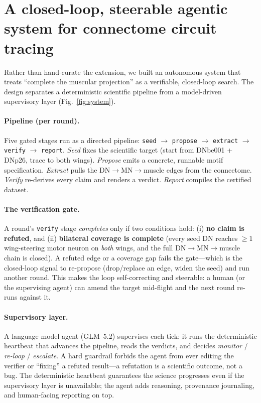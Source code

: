\documentclass[11pt]{article}
\newcommand{\ttt}[1]{\texttt{\small #1}}
\begin{document}
\section{A closed-loop, steerable agentic system for connectome circuit tracing}

Rather than hand-curate the extension, we built an autonomous system that treats ``complete the
muscular projection'' as a verifiable, closed-loop search. The design separates a deterministic
scientific pipeline from a model-driven supervisory layer (Fig.~\ref{fig:system}).

\paragraph{Pipeline (per round).} Five gated stages run as a directed pipeline:
\ttt{seed} $\rightarrow$ \ttt{propose} $\rightarrow$ \ttt{extract} $\rightarrow$ \ttt{verify}
$\rightarrow$ \ttt{report}. \emph{Seed} fixes the scientific target (start from DNbe001 + DNp26,
trace to both wings). \emph{Propose} emits a concrete, runnable motif specification. \emph{Extract}
pulls the DN$\rightarrow$MN$\rightarrow$muscle edges from the connectome. \emph{Verify} re-derives
every claim and renders a verdict. \emph{Report} compiles the certified dataset.

\paragraph{The verification gate.} A round's \ttt{verify} stage \emph{completes} only if two
conditions hold: (i) \textbf{no claim is refuted}, and (ii) \textbf{bilateral coverage is complete}
(every seed DN reaches $\geq 1$ wing-steering motor neuron on \emph{both} wings, and the full
DN$\rightarrow$MN$\rightarrow$muscle chain is closed). A refuted edge or a coverage gap fails the
gate---which is the closed-loop signal to re-propose (drop/replace an edge, widen the seed) and run
another round. This makes the loop self-correcting and steerable: a human (or the supervising agent)
can amend the target mid-flight and the next round re-runs against it.

\paragraph{Supervisory layer.} A language-model agent (GLM~5.2) supervises each tick: it runs the
deterministic heartbeat that advances the pipeline, reads the verdicts, and decides
\emph{monitor} / \emph{re-loop} / \emph{escalate}. A hard guardrail forbids the agent from ever
editing the verifier or ``fixing'' a refuted result---a refutation is a scientific outcome, not a bug.
The deterministic heartbeat guarantees the science progresses even if the supervisory layer is
unavailable; the agent adds reasoning, provenance journaling, and human-facing reporting on top.
\end{document}

